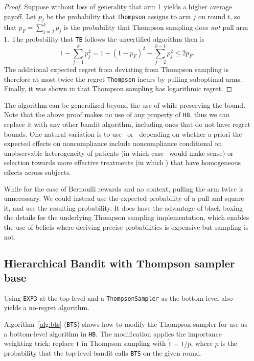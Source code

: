 \begin{proof}	
	Suppose without loss of generality that arm 1 yields a higher average payoff. Let $p_j$ be the probability that \texttt{Thompson} assigns to arm $j$ on round $t$, so that $p_F=\sum_{j=2}^kp_j$ is the probability that Thompson sampling does \emph{not} pull arm 1. The probability that \texttt{TB} follows the uncertified algorithm then is
	\begin{equation}
	1-\sum_{j=1}^kp_j^2  = 
	    1-(1-p_F)^2 - \sum_{j=2}^{k-1}p_j^2 \leq 2p_F.
	\end{equation}
	The additional expected regret from deviating from Thompson sampling is therefore at most twice the regret \texttt{Thompson} incurs by pulling suboptimal arms. Finally, it was shown in \cite{agrawal:12,kaufmann:12} that Thompson sampling has logarithmic regret.
\end{proof}%

The algorithm can be generalized beyond the use of while preserving the bound. Note that the above proof makes no use of any property of \texttt{HB}, thus we can replace it with any other bandit algorithm, including ones that do not have regret bounds. One natural variation is to use \actual\ or \comply\ depending on whether a priori the expected effects on noncompliance include noncompliance conditional on unobservable heterogeneity of patients  (in which case \comply\ would make sense) or selection towards more effective treatments (in which ) that have homogeneous effects across subjects.

While for the case of Bernoulli rewards and no context, pulling the arm twice is unnecessary. We could instead use the expected probability of a pull and square it, and use the resulting probability. It does have the advantage of black boxing the details for the underlying Thompson sampling implementation, which enables the use of beliefs where deriving precise probabilities is expensive but sampling is not. 


\subsection{Hierarchical Bandit with Thompson sampler base}


Using  \texttt{EXP3} at the top-level and a \texttt{ThompsonSampler} as the  bottom-level also yields a no-regret algorithm.

Algorithm~\ref{alg:bts} (\texttt{BTS}) shows how to modify the Thompson sampler for use as a bottom-level algorithm in \texttt{HB}. The modification applies the importance weighting trick: replace $1$ in Thompson sampling with $\tilde{1}=1/p$, where $p$ is the probability that the top-level bandit calls \texttt{BTS} on the given round. 


